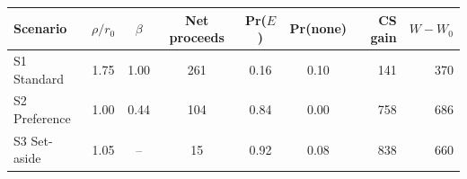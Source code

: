 \begin{tabular}{lcccccrr}
\toprule
Scenario & $\rho/r_0$ & $\beta$ & Net proceeds & Pr($E$) & Pr(none) & CS gain & $W-W_0$ \\
\midrule
S1 Standard & 1.75 & 1.00 & 261 & 0.16 & 0.10 & 141 & 370 \\
S2 Preference & 1.00 & 0.44 & 104 & 0.84 & 0.00 & 758 & 686 \\
S3 Set-aside & 1.05 & -- & 15 & 0.92 & 0.08 & 838 & 660 \\
\bottomrule
\end{tabular}
